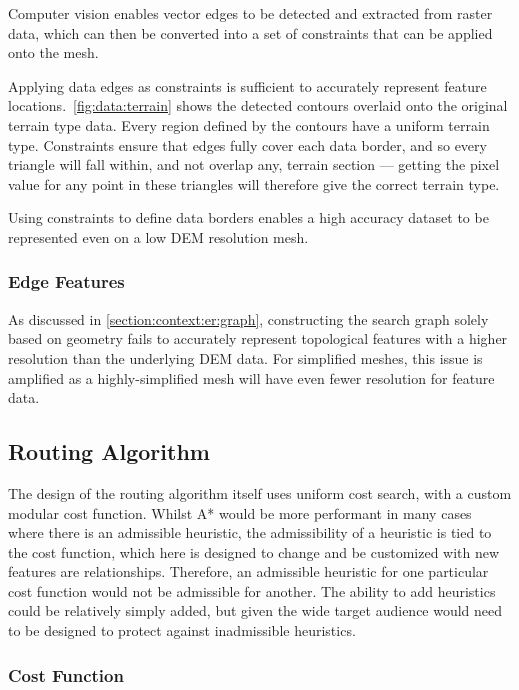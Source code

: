 \documentclass[12pt]{article}
\begin{document}
Computer vision enables vector edges to be detected and extracted from raster data, which can then be converted into a set of constraints that can be applied onto the mesh.

Applying data edges as constraints is sufficient to accurately represent feature locations.\ \autoref{fig:data:terrain} shows the detected contours overlaid onto the original terrain type data. Every region defined by the contours have a uniform terrain type. Constraints ensure that edges fully cover each data border, and so every triangle will fall within, and not overlap any, terrain section --- getting the pixel value for any point in these triangles will therefore give the correct terrain type.

Using constraints to define data borders enables a high accuracy dataset to be represented even on a low DEM resolution mesh.

\subsubsection{Edge Features}

As discussed in \autoref{section:context:er:graph}, constructing the search graph solely based on geometry fails to accurately represent topological features with a higher resolution than the underlying DEM data. For simplified meshes, this issue is amplified as a highly-simplified mesh will have even fewer resolution for feature data.

\subsection{Routing Algorithm}

The design of the routing algorithm itself uses uniform cost search, with a custom modular cost function. Whilst A* would be more performant in many cases where there is an admissible heuristic, the admissibility of a heuristic is tied to the cost function, which here is designed to change and be customized with new features are relationships. Therefore, an admissible heuristic for one particular cost function would not be admissible for another. The ability to add heuristics could be relatively simply added, but given the wide target audience would need to be designed to protect against inadmissible heuristics.

\subsubsection{Cost Function}
\end{document}
